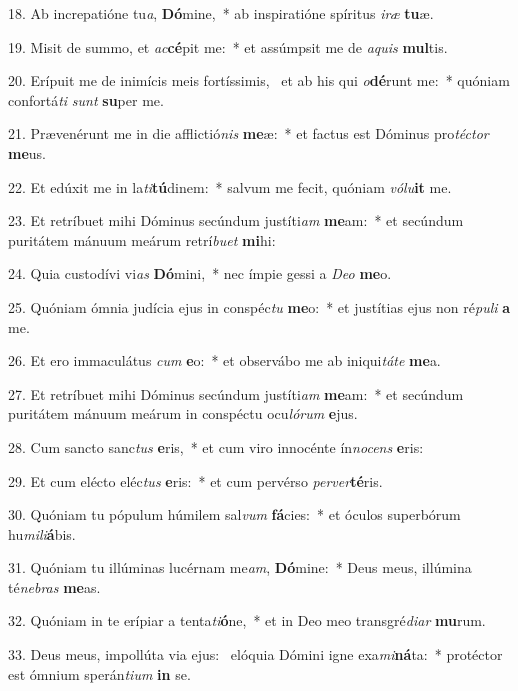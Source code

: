 18. Ab increpatióne tu\textit{a}, \textbf{Dó}mine,~*  ab inspiratióne spíritus \textit{i}\textit{ræ} \textbf{tu}æ.\

19. Misit de summo, et \textit{ac}\textbf{cé}pit me:~*  et assúmpsit me de \textit{a}\textit{quis} \textbf{mul}tis.\

20. Erípuit me de inimícis meis fortíssimis, \dag\  et ab his qui \textit{o}\textbf{dé}runt me:~*  quóniam confortá\textit{ti} \textit{sunt} \textbf{su}per me.\

21. Prævenérunt me in die afflictió\textit{nis} \textbf{me}æ:~*  et factus est Dóminus pro\textit{téc}\textit{tor} \textbf{me}us.\

22. Et edúxit me in la\textit{ti}\textbf{tú}dinem:~*  salvum me fecit, quóniam \textit{vó}\textit{lu}\textbf{it} me.\

23. Et retríbuet mihi Dóminus secúndum justíti\textit{am} \textbf{me}am:~*  et secúndum puritátem mánuum meárum retrí\textit{bu}\textit{et} \textbf{mi}hi:\

24. Quia custodívi vi\textit{as} \textbf{Dó}mini,~*  nec ímpie gessi a \textit{De}\textit{o} \textbf{me}o.\

25. Quóniam ómnia judícia ejus in conspéc\textit{tu} \textbf{me}o:~*  et justítias ejus non ré\textit{pu}\textit{li} \textbf{a} me.\

26. Et ero immaculátus \textit{cum} \textbf{e}o:~*  et observábo me ab iniqui\textit{tá}\textit{te} \textbf{me}a.\

27. Et retríbuet mihi Dóminus secúndum justíti\textit{am} \textbf{me}am:~*  et secúndum puritátem mánuum meárum in conspéctu ocu\textit{ló}\textit{rum} \textbf{e}jus.\

28. Cum sancto sanc\textit{tus} \textbf{e}ris,~*  et cum viro innocénte ín\textit{no}\textit{cens} \textbf{e}ris:\

29. Et cum elécto eléc\textit{tus} \textbf{e}ris:~*  et cum pervérso \textit{per}\textit{ver}\textbf{té}ris.\

30. Quóniam tu pópulum húmilem sal\textit{vum} \textbf{fá}cies:~*  et óculos superbórum hu\textit{mi}\textit{li}\textbf{á}bis.\

31. Quóniam tu illúminas lucérnam me\textit{am}, \textbf{Dó}mine:~*  Deus meus, illúmina té\textit{ne}\textit{bras} \textbf{me}as.\

32. Quóniam in te erípiar a tenta\textit{ti}\textbf{ó}ne,~*  et in Deo meo transgré\textit{di}\textit{ar} \textbf{mu}rum.\

33. Deus meus, impollúta via ejus: \dag\  elóquia Dómini igne exa\textit{mi}\textbf{ná}ta:~*  protéctor est ómnium sperán\textit{ti}\textit{um} \textbf{in} se.\

